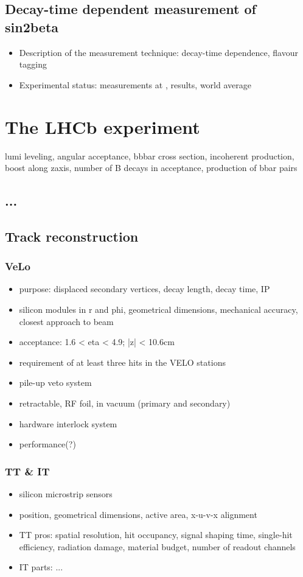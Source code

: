 \section{Decay-time dependent measurement of sin2beta}
\begin{itemize}
  \item Description of the measurement technique: decay-time dependence, flavour tagging
  \item Experimental status: measurements at , results, world average
\end{itemize}

\chapter{The LHCb experiment}
lumi leveling, angular acceptance, bbbar cross section, incoherent production, boost along zaxis, number of B decays in acceptance, production of bbar pairs
\section{...}
\section{Track reconstruction}
\subsection{VeLo}
\begin{itemize}
  \item purpose: displaced secondary vertices, decay length, decay time, IP
  \item silicon modules in r and phi, geometrical dimensions, mechanical accuracy, closest approach to beam
  \item acceptance: 1.6 < eta < 4.9; |z| < 10.6cm
  \item requirement of at least three hits in the VELO stations
  \item pile-up veto system
  \item retractable, RF foil, in vacuum (primary and secondary)
  \item hardware interlock system
  \item performance(?)
\end{itemize}
\subsection{TT \& IT}
\begin{itemize}
  \item silicon microstrip sensors
  \item position, geometrical dimensions, active area, x-u-v-x alignment
  \item TT pros: spatial resolution, hit occupancy, signal shaping time, single-hit efficiency, radiation damage, material budget, number of readout channels
  \item IT parts: ...
\end{itemize}
